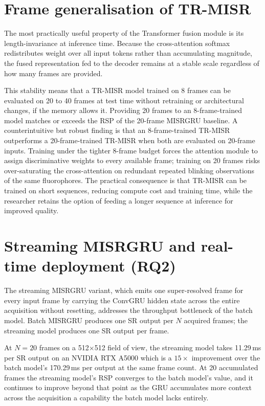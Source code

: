 \section*{Frame generalisation of TR-MISR}

The most practically useful property of the Transformer fusion module is its
length-invariance at inference time.
Because the cross-attention softmax redistributes weight over all input tokens rather than
accumulating magnitude, the fused representation fed to the decoder remains at a stable
scale regardless of how many frames are provided.

This stability means that a TR-MISR model trained on 8 frames can be evaluated on 20 to 40
frames at test time without retraining or architectural changes, if the memory allows it.
Providing 20 frames to an 8-frame-trained model matches or exceeds the RSP of the
20-frame MISRGRU baseline.
A counterintuitive but robust finding is that an 8-frame-trained TR-MISR outperforms a
20-frame-trained TR-MISR when both are evaluated on 20-frame inputs.
Training under the tighter 8-frame budget forces the attention module to assign
discriminative weights to every available frame; training on 20 frames risks over-saturating
the cross-attention on redundant repeated blinking observations of the same fluorophores.
The practical consequence is that TR-MISR can be trained on short sequences, reducing
compute cost and training time, while the researcher retains the option of feeding a
longer sequence at inference for improved quality.

\section*{Streaming MISRGRU and real-time deployment (RQ2)}

The streaming MISRGRU variant, which emits one super-resolved frame for every input frame
by carrying the ConvGRU hidden state across the entire acquisition without resetting,
addresses the throughput bottleneck of the batch model.
Batch MISRGRU produces one SR output per $N$ acquired frames; the streaming model produces
one SR output per frame.

At $N{=}20$ frames on a 512$\times$512 field of view, the streaming model takes
11.29\,ms per SR output on an NVIDIA RTX A5000 which is a $15\times$ improvement over the batch
model's 170.29\,ms per output at the same frame count.
At 20 accumulated frames the streaming model's RSP converges to the batch model's value,
and it continues to improve beyond that point as the GRU accumulates more context across
the acquisition a capability the batch model lacks entirely.

